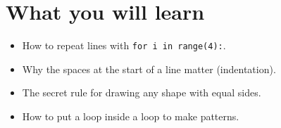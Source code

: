 
\section{What you will learn}
\begin{itemize}[leftmargin=1.2em,itemsep=1pt]
  \item How to repeat lines with \texttt{for i in range(4):}.
  \item Why the spaces at the start of a line matter (indentation).
  \item The secret rule for drawing any shape with equal sides.
  \item How to put a loop inside a loop to make patterns.
\end{itemize}

